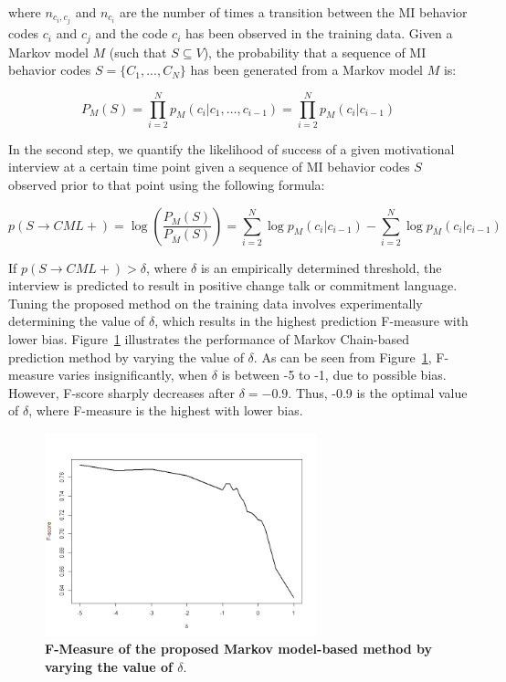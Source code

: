 \documentclass{amia_summit_2018}
\begin{document}
where $n_{c_i,c_j}$ and $n_{c_i}$ are the number of times a transition between the MI behavior codes $c_i$ and $c_j$ and the code $c_i$ has been observed in the training data. Given a Markov model $M$ (such that $S\subseteq V$), the probability that a sequence of MI behavior codes $S = \{C_1,...,C_N\}$ has been generated from a Markov model $M$ is:

\begin{equation}
P_M(S) = \prod_{i=2}^N p_M(c_i|c_1,\dots,c_{i-1})=\prod_{i=2}^N p_M(c_i|c_{i-1})
\end{equation}

In the second step, we quantify the likelihood of success of a given motivational interview at a certain time point given a sequence of MI behavior codes $S$ observed prior to that point using the following formula:

\begin{equation}
p(S\rightarrow CML+) = \log\left(\frac{P_M(S)}{P_{\overline M}(S)}\right)= \sum_{i=2}^N \log p_M(c_i|c_{i-1})-\sum_{i=2}^N \log p_{\overline M}(c_i|c_{i-1})\label{eq:class}
\end{equation}

If $p(S\rightarrow CML+) > \delta $, where $\delta$ is an empirically determined threshold, the interview is predicted to result in positive change talk or commitment language. Tuning the proposed method on the training data involves experimentally determining the value of $\delta$, which results in the highest prediction F-measure with lower bias. Figure~\ref{fig:delta} illustrates the performance of Markov Chain-based prediction method by varying the value of $\delta$. As can be seen from Figure~\ref{fig:delta}, F-measure varies insignificantly, when $\delta $ is between -5 to -1, due to possible bias. However, F-score sharply decreases after $\delta = -0.9$. Thus, -0.9 is the optimal value of $\delta $, where F-measure is the highest with lower bias. 

\begin{figure}[htb!]
    \centering
    \includegraphics[width=0.70\textwidth]{figures/delta.png}
    \caption{\textbf{F-Measure of the proposed Markov model-based method by varying the value of $\delta$}.}
    \label{fig:delta}
\end{figure}
\end{document}
